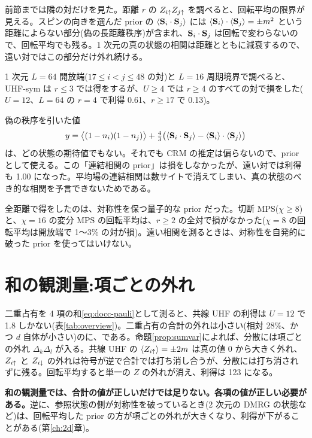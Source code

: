 前節までは隣の対だけを見た。距離 $r$ の $Z_{i\uparrow}Z_{j\uparrow}$ を調べると、回転平均の限界が見える。スピンの向きを選んだ prior の $\langle \mathbf S_i\cdot\mathbf S_j\rangle$ には $\langle \mathbf S_i\rangle\cdot\langle \mathbf S_j\rangle=\pm m^2$ という距離によらない部分(偽の長距離秩序)が含まれ、$\mathbf S_i\cdot\mathbf S_j$ は回転で変わらないので、回転平均でも残る。1 次元の真の状態の相関は距離とともに減衰するので、遠い対ではこの部分だけ外れ続ける。

1 次元 $L=64$ 開放端($17\le i<j\le48$ の対)と $L=16$ 周期境界で調べると、UHF-sym は $r\le3$ では得をするが、$U\ge4$ では $r\ge4$ のすべての対で損をした($U=12$、$L=64$ の $r=4$ で利得 0.61、$r\ge17$ で 0.13)。

偽の秩序を引いた値
\begin{equation}
  y=\bigl\langle(1-n_i)(1-n_j)\bigr\rangle+\tfrac43\bigl(\langle \mathbf S_i\cdot\mathbf S_j\rangle-\langle \mathbf S_i\rangle\cdot\langle \mathbf S_j\rangle\bigr)
\end{equation}
は、どの状態の期待値でもない。それでも CRM の推定は偏らないので、prior として使える。この「連結相関の prior」は損をしなかったが、遠い対では利得も 1.00 になった。平均場の連結相関は数サイトで消えてしまい、真の状態のべき的な相関を予言できないためである。

全距離で得をしたのは、対称性を保つ量子的な prior だった。切断 MPS($\chi\ge8$)と、$\chi=16$ の変分 MPS の回転平均は、$r\ge2$ の全対で損がなかった($\chi=8$ の回転平均は開放端で 1〜3\% の対が損)。遠い相関を測るときは、対称性を自発的に破った prior を使ってはいけない。

\section{和の観測量:項ごとの外れ}
\label{sec:sumobs}

二重占有を 4 項の和\eqref{eq:docc-pauli}として測ると、共線 UHF の利得は $U=12$ で 1.8 しかない(表\ref{tab:overview})。二重占有の合計の外れは小さい(相対 28\%、かつ $d$ 自体が小さい)のに、である。命題\ref{prop:sumvar}によれば、分散には項ごとの外れ $\Delta_k\Delta_l$ が入る。共線 UHF の $\langle Z_{i\uparrow}\rangle=\pm2m$ は真の値 0 から大きく外れ、$Z_{i\uparrow}$ と $Z_{i\downarrow}$ の外れは符号が逆で合計では打ち消し合うが、分散には打ち消されずに残る。回転平均すると単一の $Z$ の外れが消え、利得は 123 になる。

\textbf{和の観測量では、合計の値が正しいだけでは足りない。各項の値が正しい必要がある。}逆に、参照状態の側が対称性を破っているとき(2 次元の DMRG の状態など)は、回転平均した prior の方が項ごとの外れが大きくなり、利得が下がることがある(第\ref{ch:2d}章)。

